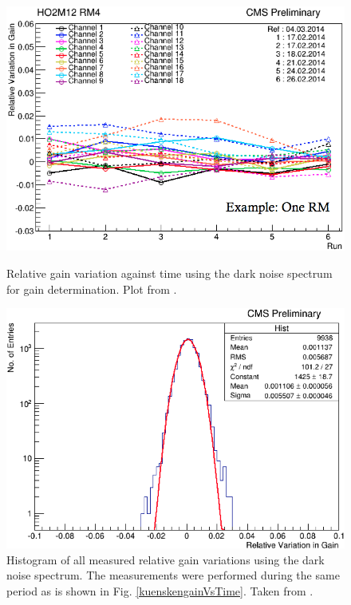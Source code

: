 \begin{figure}[h]
\centering
\begin{minipage}[t]{0.475\textwidth}
\includegraphics[width=\textwidth]{Figures/kuensken/gainOverTime.png}
\caption{Relative gain variation against time using the dark noise spectrum for gain determination. Plot from \cite{kuenskenCalor}.}
\label{kuenskengainVsTime}
\end{minipage}
\hspace{0.5cm}
\begin{minipage}[t]{0.475\textwidth}
\includegraphics[width=\textwidth]{Figures/kuensken/gainTotal.png}
\caption{Histogram of all measured relative gain variations using the dark noise spectrum. The measurements were performed during the same period as is shown in Fig. \ref{kuenskengainVsTime}. Taken from \cite{kuenskenCalor}.}
\label{kuenskengainHist}
\end{minipage}
\end{figure}
